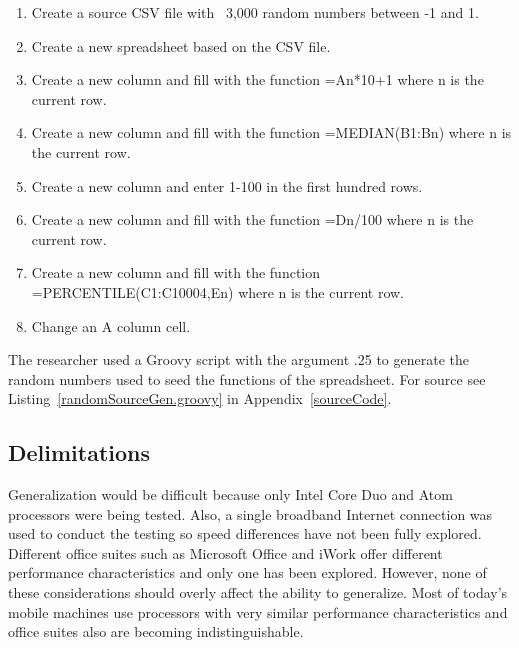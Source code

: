 \begin{enumerate}

\item Create a source CSV file with ~3,000 random numbers between -1 and 1.

\item Create a new spreadsheet based on the CSV file.

\item Create a new column and fill with the function =An*10+1 where n is the
  current row.

\item Create a new column and fill with the function =MEDIAN(B1:Bn) where n is
  the current row.

\item Create a new column and enter 1-100 in the first hundred rows.

\item Create a new column and fill with the function =Dn/100 where n is the
  current row.

\item Create a new column and fill with the function =PERCENTILE(C1:C10004,En)
  where n is the current row.

\item Change an A column cell.

\end{enumerate}

The researcher used a Groovy script with the argument .25 to generate the random
numbers used to seed the functions of the spreadsheet.  For source
see Listing~\ref{randomSourceGen.groovy} in Appendix~\ref{sourceCode}.

\subsection{Delimitations}


Generalization would be difficult because only Intel Core Duo and Atom
processors were being tested.  Also, a single broadband Internet connection was
used to conduct the testing so speed differences have not been fully explored.
Different office suites such as Microsoft Office and iWork offer different
performance characteristics and only one has been explored.  However, none of
these considerations should overly affect the ability to generalize.  Most of
today's mobile machines use processors with very similar performance
characteristics and office suites also are becoming indistinguishable.

